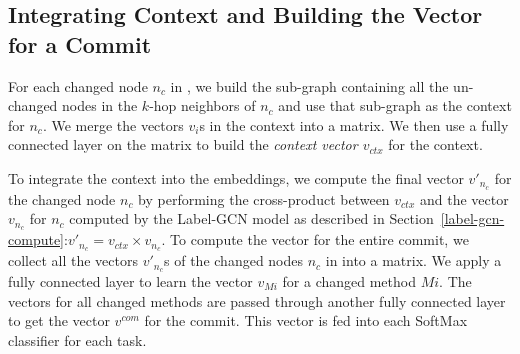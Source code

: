 

\subsection{Integrating Context and Building the Vector for a Commit}
\label{class:sec}

For each changed node $n_c$ in {\mvpdgxy}, we build the sub-graph
containing all the un-changed nodes in the $k$-hop neighbors of $n_c$
and use that sub-graph as the context for $n_c$. We merge the vectors $v_i$s
in the context into a matrix. We then use a fully connected layer on
the matrix to build the {\em context vector $v_{ctx}$} for
the context.

To integrate the context into the embeddings, we compute the final
vector $v{'}_{n_{c}}$ for the changed node $n_c$ by performing the
cross-product between $v_{ctx}$ and the vector $v_{n_c}$ for $n_c$
computed by the Label-GCN model as described in
Section~\ref{label-gcn-compute}:$v{'}_{n_c} = v_{ctx} \times
v_{n_c}$.
To compute the vector for the entire commit, we collect all
the vectors $v{'}_{n_c}$s of the changed nodes $n_c$ in {\mvpdgxy}
into a matrix. We apply a fully connected layer to learn
the vector $v_{Mi}$ for a changed method $Mi$. The vectors for all changed
methods are passed through another fully connected layer to get the
vector $v^{com}$ for the commit. This vector is fed
into each SoftMax classifier for each task.

